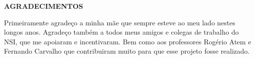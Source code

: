 \begin{center}
\textbf{AGRADECIMENTOS}
\end{center}

Primeiramente agradeço a minha mãe que sempre esteve ao meu lado nestes longos anos.
Agradeço também a todos meus amigos e colegas de trabalho do NSI, que me apoiaram e incentivaram.
Bem como aos professores Rogério Atem e Fernando Carvalho que contribuiram muito para que esse projeto fosse realizado.
